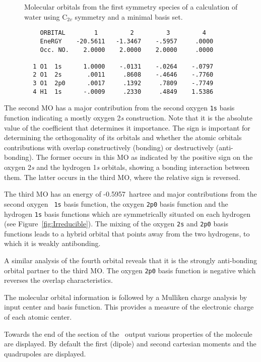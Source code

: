 \begin{figure}[h]
\caption{Molecular orbitals from the first symmetry species of a calculation of water using C$_{2v}$ symmetry and a minimal basis set.}
\label{fig:water_MOs}
\end{figure}
{\footnotesize
\begin{verbatim}
          ORBITAL        1         2         3         4
          EneRGY    -20.5611   -1.3467    -.5957     .0000
          Occ. NO.    2.0000    2.0000    2.0000     .0000

        1 O1  1s      1.0000    -.0131    -.0264    -.0797
        2 O1  2s       .0011     .8608    -.4646    -.7760
        3 O1  2p0      .0017     .1392     .7809    -.7749
        4 H1  1s      -.0009     .2330     .4849    1.5386
\end{verbatim}}

The second MO has a major contribution from the second oxygen {\tt 1s}
basis function indicating a mostly oxygen 2{\it s} construction.  
Note that it is the
absolute value of the coefficient that determines it importance.  The
sign is important for determining the orthogonality of its orbitals and
whether the atomic orbitals contributions with overlap constructively
(bonding) or destructively (anti-bonding).  
The former occurs in this MO as indicated by the positive sign on the
oxygen 2{\it s} and the hydrogen 1{\it s} orbitals, showing a bonding
interaction between them.
The latter occurs in the third MO, where the relative sign is reversed.

The third MO has an energy of 
-0.5957~hartree and major contributions from the second oxygen {\tt
1s} basis function, the oxygen {\tt 2p0} basis function and the 
hydrogen {\tt 1s} basis functions which are symmetrically situated on
each hydrogen (see Figure~\ref{fig:Irreducible}).  The mixing of the
oxygen {\tt 2s} and {\tt 2p0} basis functions leads to a hybrid
orbital that points away from the two hydrogens,  to which it is
weakly antibonding.

A similar analysis of the fourth orbital reveals that it is the 
strongly anti-bonding orbital partner to the third MO.  The oxygen {\tt 2p0}
basis function is negative which reverses the overlap characteristics.

The molecular orbital information is followed by a Mulliken charge
analysis by input center and basis function.  This provides a measure
of the electronic charge of each atomic center.

Towards the end of the  section of the \molcas\ output
various properties of the molecule are displayed.  By default the
first (dipole) and second cartesian moments and the quadrupoles are displayed.

